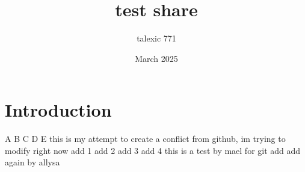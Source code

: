 \documentclass{article}
\title{test share}
\author{talexic 771 }
\date{March 2025}
\begin{document}
\maketitle

\section{Introduction}
A
B
C
D
E
this is my attempt to create a conflict
from github, im trying to modify right now
add 1
add 2
add 3
add 4
this is a test by mael for git
add
add again by allysa
\end{document}
